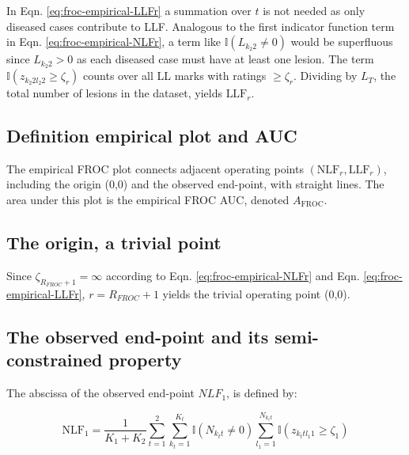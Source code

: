 \documentclass[
]{book}
\begin{document}
In Eqn. \eqref{eq:froc-empirical-LLFr} a summation over \(t\) is not needed as only diseased cases contribute to LLF. Analogous to the first indicator function term in Eqn. \eqref{eq:froc-empirical-NLFr}, a term like \(\mathbb{I} \left ( L_{k_2 2} \neq 0 \right )\) would be superfluous since \(L_{k_2 2} > 0\) as each diseased case must have at least one lesion. The term \(\mathbb{I} \left ( z_{k_2 2 l_2 2} \geq \zeta_r \right )\) counts over all LL marks with ratings \(\geq \zeta_r\). Dividing by \(L_T\), the total number of lesions in the dataset, yields \(\text{LLF}_r\).

\hypertarget{froc-empirical-definition-empirical-auc-froc}{%
\subsection{Definition empirical plot and AUC}\label{froc-empirical-definition-empirical-auc-froc}}

The empirical FROC plot connects adjacent operating points \(\left (\text{NLF}_r, \text{LLF}_r \right )\), including the origin (0,0) and the observed end-point, with straight lines. The area under this plot is the empirical FROC AUC, denoted \(A_{\text{FROC}}\).

\hypertarget{froc-empirical-origin-trivial-point}{%
\subsection{The origin, a trivial point}\label{froc-empirical-origin-trivial-point}}

Since \(\zeta_{R_{FROC}+1} = \infty\) according to Eqn. \eqref{eq:froc-empirical-NLFr} and Eqn. \eqref{eq:froc-empirical-LLFr}, \(r = R_{FROC}+1\) yields the trivial operating point (0,0).

\hypertarget{froc-empirical-end-point}{%
\subsection{The observed end-point and its semi-constrained property}\label{froc-empirical-end-point}}

The abscissa of the observed end-point \(NLF_1\), is defined by:

\begin{equation}
\text{NLF}_1 = \frac{1}{K_1+K_2} \sum_{t=1}^{2} \sum_{k_t=1}^{K_t} \mathbb{I} \left ( N_{k_t t} \neq 0 \right ) \sum_{l_1=1}^{N_{k_t t}} \mathbb{I} \left ( z_{k_t t l_1 1} \geq \zeta_1 \right ) 
\label{eq:froc-empirical-NLF11}
\end{equation}
\end{document}
